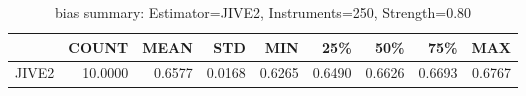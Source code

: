 \begin{table}[ht]
\centering
\caption{bias summary: Estimator=JIVE2, Instruments=250, Strength=0.80}
\begin{tabular}{lrrrrrrrr}
\toprule
 & COUNT & MEAN & STD & MIN & 25\% & 50\% & 75\% & MAX \\
\midrule
JIVE2 & 10.0000 & 0.6577 & 0.0168 & 0.6265 & 0.6490 & 0.6626 & 0.6693 & 0.6767 \\
\bottomrule
\end{tabular}
\end{table}
